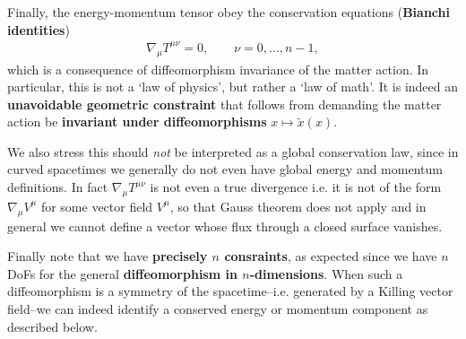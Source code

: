 \begin{mytheorem}
Finally, the energy-momentum tensor obey the conservation equations (\textbf{Bianchi identities})
\begin{align}
    \nabla_\mu T^{\mu\nu} = 0,\qquad \nu=0,\ldots, n-1,
\end{align}
which is a consequence of diffeomorphism invariance of the matter action.
In particular, this is not a `law of physics', but rather a `law of math'.
It is indeed an \textbf{unavoidable geometric constraint} that follows from demanding the matter action be \textbf{invariant under diffeomorphisms} $x\mapsto \tilde{x}(x)$.

We also stress this should \emph{not} be interpreted as a global conservation law, since in curved spacetimes we generally do not even have global energy and momentum definitions.
In fact $\nabla_\mu T^{\mu\nu}$ is not even a true divergence i.e. it is not of the form $\nabla_\mu V^\mu$ for some vector field $V^\mu$, so that Gauss theorem does not apply and in general we cannot define a vector whose flux through a closed surface vanishes.

Finally note that we have \textbf{precisely $n$ consraints}, as expected since we have $n$ DoFs for the general \textbf{diffeomorphism in $n$-dimensions}.
When such a diffeomorphism is a symmetry of the spacetime--i.e. generated by a Killing vector field--we can indeed identify a conserved energy or momentum component as described below.
%
\end{mytheorem}
